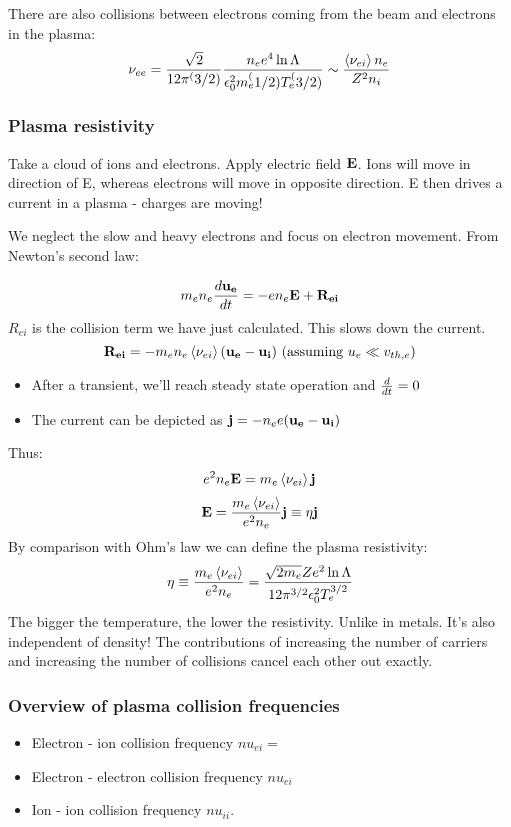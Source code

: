 \documentclass[PlasmaNotes.tex]{subfiles}
\begin{document}
There are also collisions between electrons coming from the beam and electrons in the plasma:
\[ \nu_{ee} = \frac{\sqrt{2}}{12 \pi^(3/2)} \frac{n_e e^4 \ln{\Lambda}}{\epsilon_0^2 m_e^(1/2) T_e^(3/2)} \sim \frac{\left< \nu_{ei} \right> n_e}{Z^2 n_i} \]

\subsubsection{Plasma resistivity}
Take a cloud of ions and electrons. Apply electric field $\mathbf{E}$. Ions will move in direction of E, whereas electrons will move in opposite direction. E then drives a current in a plasma - charges are moving!

We neglect the slow and heavy electrons and focus on electron movement. From Newton's second law:

\[m_e n_e \frac{d \mathbf{u_e}}{d t} = -e n_e \mathbf{E} + \mathbf{R_{ei}} \]
$R_{ei}$ is the collision term we have just calculated. This slows down the current.
\[\mathbf{R_{ei}} = - m_e n_e \left< \nu_{ei} \right> (\mathbf{u_e}-\mathbf{u_i}) \text{ (assuming } u_e \ll v_{th,e} ) \]

\begin{itemize}
\item After a transient, we'll reach steady state operation and $\frac{d }{d t}=0$
\item The current can be depicted as $\mathbf{j} = - n_e e (\mathbf{u_e}-\mathbf{u_i})$
\end{itemize}
Thus:
\[ e^2 n_e \mathbf{E} = m_e \left< \nu_{ei} \right> \mathbf{j}\]
\[ \mathbf{E} = \frac{m_e \left< \nu_{ei} \right>}{e^2 n_e} \mathbf{j} \equiv \eta \mathbf{j} \]
By comparison with Ohm's law we can define the plasma resistivity:
\[ \eta \equiv \frac{m_e \left< \nu_{ei} \right>}{e^2 n_e} = \frac{ \sqrt{2 m_e} Z	e^2 \ln{\Lambda}}{12 \pi^{3/2} \epsilon_0^2 T_e^{3/2}} \]
The bigger the temperature, the lower the resistivity. Unlike in metals. It's also independent of density! The contributions of increasing the number of carriers and increasing the number of collisions cancel each other out exactly.
\subsubsection{Overview of plasma collision frequencies}
\begin{itemize}
\item Electron - ion collision frequency $nu_{ei} = $ 
\item Electron - electron collision frequency $nu_{ei}$
\item Ion - ion collision frequency $nu_{ii}$.
\end{itemize}
\end{document}
